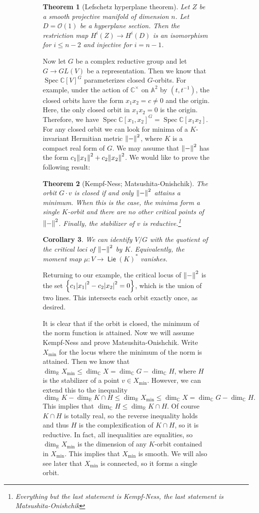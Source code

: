 \documentclass[leqno, openany]{memoir}
\newtheorem{thm}{Theorem}[section]
\newtheorem{cor}[thm]{Corollary}
\theoremstyle{definition}
\theoremstyle{remark}
\theoremstyle{plain}
\theoremstyle{definition}
\theoremstyle{remark}
\newcommand{\A}{\mathbb{A}}
\newcommand{\R}{\mathbb{R}}
\newcommand{\C}{\mathbb{C}}
\newcommand{\mc}[1]{\mathcal{#1}}
\DeclareMathOperator{\Spec}{Spec}
\DeclareMathOperator{\Lie}{\mathsf{Lie}}
\begin{document}
\begin{figure}[H]
\begin{figure}[H]
\begin{thm}[Lefschetz hyperplane theorem] Let $Z$ be a smooth projective
    manifold of dimension $n$. Let $D = \mc{O}(1)$ be a hyperplane section.
    Then the restriction map $H^i(Z) \to H^i(D)$ is an isomorphism for $i \leq
    n-2$ and injective for $i = n-1$.  \end{thm}

Now let $G$ be a complex reductive group and let $G \to GL(V)$ be a
representation. Then we know that $\Spec {\C[V]}^G$ parameterizes closed
$G$-orbits. For example, under the action of $\C^{\times}$ on $\A^2$ by $(t,
t^{-1})$, the closed orbits have the form $x_1x_2 = c \neq 0$ and the origin.
Here, the only closed orbit in $x_1x_2 = 0$ is the origin. Therefore, we have
$\Spec {\C[x_1,x_2]}^G = \Spec \C[x_1x_2]$. For any closed orbit we can look
for minima of a $K$-invariant Hermitian metric $\norm{-}^2$, where $K$ is a
compact real form of $G$. We may assume that $\norm{-}^2$ has the form $c_1
\norm{x_1}^2 + c_2 \norm{x_2}^2$. We would like to prove the following result:

\begin{thm}[Kempf-Ness; Matsushita-Onishchik] The orbit $G\cdot v$ is closed if
    and only $\norm{-}^2$ attains a minimum. When this is the case, the minima
    form a single $K$-orbit and there are no other critical points of
    $\norm{-}^2$. Finally, the stabilizer of $v$ is
    reductive.\footnote{Everything but the last statement is Kempf-Ness, the
    last statement is Matsushita-Onishchik} \end{thm}

\begin{cor} We can identify $V/G$ with the quotient of the critical loci of
$\norm{-}^2$ by $K$. Equivalently, the moment map $\mu \colon V \to
{\Lie(K)}^*$ vanishes.  \end{cor}

Returning to our example, the critical locus of $\norm{-}^2$ is the set
$\qty{c_1 \abs{x_1}^2 - c_2 \abs{x_2}^2 = 0}$, which is the union of two lines.
This intersects each orbit exactly once, as desired.

It is clear that if the orbit is closed, the minimum of the norm function is
attained. Now we will assume Kempf-Ness and prove Matsushita-Onishchik. Write
$X_{\min}$ for the locus where the minimum of the norm is attained. Then we
know that $\dim_{\R} X_{\min} \leq \dim_{\C} X = \dim_{\C} G - \dim_{\C} H$,
where $H$ is the stabilizer of a point $v \in X_{\min}$. However, we can extend
this to the inequality \[ \dim_{\R} K - \dim_{\R} K \cap H \leq \dim_{\R}
X_{\min} \leq \dim_{\C} X = \dim_{\C} G - \dim_{\C} H. \] This implies that
$\dim_{\C} H \leq \dim_{\R} K \cap H$. Of course $K \cap H$ is totally real, so
the reverse inequality holds and thus $H$ is the complexification of $K \cap
H$, so it is reductive. In fact, all inequalities are equalities, so $\dim_{\R}
X_{\min}$ is the dimension of any $K$-orbit contained in $X_{\min}$. This
implies that $X_{\min}$ is smooth. We will also see later that $X_{\min}$ is
connected, so it forms a single orbit.


\end{figure}
\end{figure}
\end{document}
